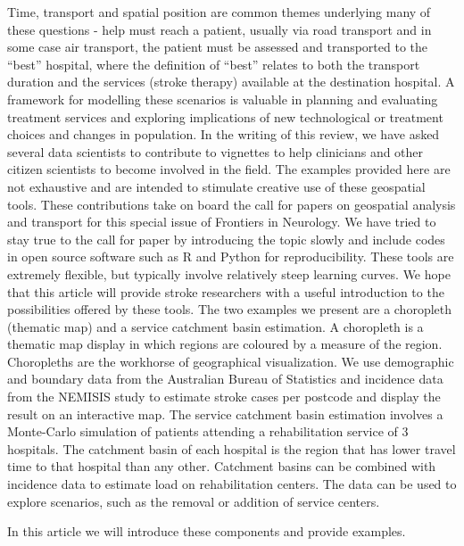 \documentclass[utf8]{frontiersHLTH}
\begin{document}
Time, transport and spatial position are common themes underlying many
of these questions - help must reach a patient, usually via road
transport and in some case air transport, the patient must be assessed
and transported to the ``best'' hospital, where the definition of
``best'' relates to both the transport duration and the services
(stroke therapy) available at the destination hospital. A framework
for modelling these scenarios is valuable in planning and evaluating
treatment services and exploring implications of new technological or
treatment choices and changes in population. In the writing of this
review, we have asked several data scientists to contribute to
vignettes to help clinicians and other citizen scientists to become
involved in the field. The examples provided here are not exhaustive
and are intended to stimulate creative use of these geospatial
tools. These contributions take on board the call for papers on
geospatial analysis and transport for this special issue of Frontiers
in Neurology. We have tried to stay true to the call for paper by
introducing the topic slowly and include codes in open source software
such as R and Python for reproducibility. These tools are extremely
flexible, but typically involve relatively steep learning curves. We
hope that this article will provide stroke researchers with a useful
introduction to the possibilities offered by these tools. The two
examples we present are a choropleth (thematic map) and a service
catchment basin estimation. A choropleth is a thematic map display in
which regions are coloured by a measure of the region. Choropleths are
the workhorse of geographical visualization. We use demographic and
boundary data from the Australian Bureau of Statistics and incidence
data from the NEMISIS
\cite{thrift_stroke_2000,azarpazhooh2008patterns} study to estimate
stroke cases per postcode and display the result on an interactive
map. The service catchment basin estimation involves a Monte-Carlo
simulation of patients attending a rehabilitation service of 3
hospitals. The catchment basin of each hospital is the region that has
lower travel time to that hospital than any other.  Catchment basins
can be combined with incidence data to estimate load on rehabilitation
centers. The data can be used to explore scenarios, such as the
removal or addition of service centers.

In this article we will introduce these components and provide
examples.
\end{document}
